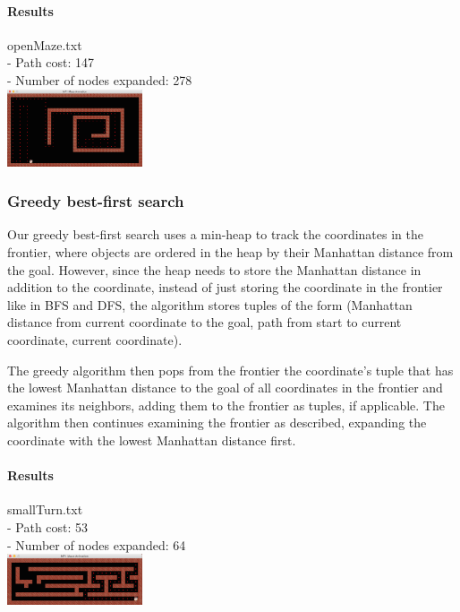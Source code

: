 \begin{multicols*}{2}
\columnbreak
\paragraph{Results}
openMaze.txt\\
- Path cost: 147\\
- Number of nodes expanded: 278\\
\includegraphics[width=0.3\textwidth]{graphics/openMaze_dfs.png}

\subsubsection*{Greedy best-first search}
Our greedy best-first search uses a min-heap to track the coordinates in the frontier, where objects are ordered in the heap by their Manhattan distance from the goal. However, since the heap needs to store the Manhattan distance in addition to the coordinate, instead of just storing the coordinate in the frontier like in BFS and DFS, the algorithm stores tuples of the form (Manhattan distance from current coordinate to the goal, path from start to current coordinate, current coordinate).

The greedy algorithm then pops from the frontier the coordinate's tuple that has the lowest Manhattan distance to the goal of all coordinates in the frontier and examines its neighbors, adding them to the frontier as tuples, if applicable. The algorithm then continues examining the frontier as described, expanding the coordinate with the lowest Manhattan distance first.

\paragraph{Results}
smallTurn.txt\\
- Path cost: 53\\
- Number of nodes expanded: 64\\
\includegraphics[width=0.3\textwidth]{graphics/smallTurn_greedy.png}


\end{multicols*}
